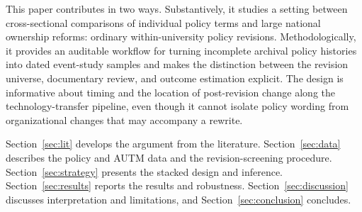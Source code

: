 This paper contributes in two ways. Substantively, it studies a setting between cross-sectional comparisons of individual policy terms and large national ownership reforms: ordinary within-university policy revisions. Methodologically, it provides an auditable workflow for turning incomplete archival policy histories into dated event-study samples and makes the distinction between the revision universe, documentary review, and outcome estimation explicit. The design is informative about timing and the location of post-revision change along the technology-transfer pipeline, even though it cannot isolate policy wording from organizational changes that may accompany a rewrite.

Section~\ref{sec:lit} develops the argument from the literature. Section~\ref{sec:data} describes the policy and AUTM data and the revision-screening procedure. Section~\ref{sec:strategy} presents the stacked design and inference. Section~\ref{sec:results} reports the results and robustness. Section~\ref{sec:discussion} discusses interpretation and limitations, and Section~\ref{sec:conclusion} concludes.
